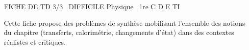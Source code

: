 \documentclass[11pt]{article}
\begin{document}
\begin{tcolorbox}[enhanced,colback=popink,colframe=popink,arc=10pt,boxrule=0pt,left=12pt,right=12pt,top=9pt,bottom=9pt]
{\color{white}\popxbold\small FICHE DE TD 3/3 \textbullet\ DIFFICILE \hfill Physique \textbullet\ 1re C D E TI\par}
\end{tcolorbox}
\vspace{4pt}
Cette fiche propose des problèmes de synthèse mobilisant l'ensemble des notions du chapitre (transferts, calorimétrie, changements d'état) dans des contextes réalistes et critiques.
\end{document}
